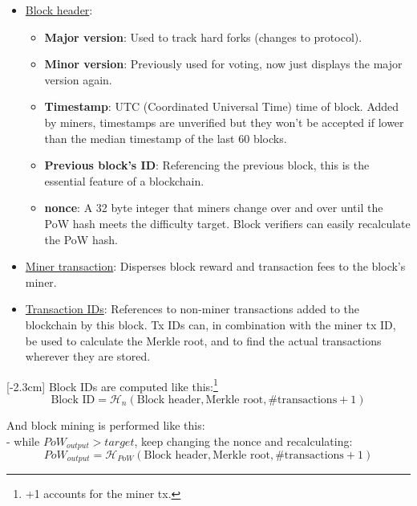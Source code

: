 \begin{itemize}
    \item \underline{Block header}:
    \begin{itemize}
        \item \textbf{Major version}: Used to track hard forks (changes to protocol).
        \item \textbf{Minor version}: Previously used for voting, now just displays the major version again.
        \item \textbf{Timestamp}: UTC (Coordinated Universal Time) time of block. Added by miners, timestamps are unverified but they won't be accepted if lower than the median timestamp of the last 60 blocks. %
        \item \textbf{Previous block's ID}: Referencing the previous block, this is the essential feature of a blockchain.
        \item \textbf{nonce}: A 32 byte integer that miners change over and over until the PoW hash meets the difficulty target. Block verifiers can easily recalculate the PoW hash.
    \end{itemize}
    \item \underline{Miner transaction}: Disperses block reward and transaction fees to the block's miner.
    \item \underline{Transaction IDs}: References to non-miner transactions added to the blockchain by this block. Tx IDs can, in combination with the miner tx ID, be used to calculate the Merkle root, and to find the actual transactions wherever they are stored.
\end{itemize}
[-2.3cm]
Block IDs are computed like this:\footnote{+1 accounts for the miner tx.} %
\[ \textrm{Block ID} = \mathcal{H}_n(\textrm{Block header}, \textrm{Merkle root}, \# \textrm{transactions} + 1) \]

And block mining is performed like this:\\ %
\quad - while ${PoW}_{output} > {target}$, keep changing the nonce and recalculating:
\[ {PoW}_{output} = \mathcal{H}_{PoW}(\textrm{Block header}, \textrm{Merkle root}, \# \textrm{transactions} + 1) \]

